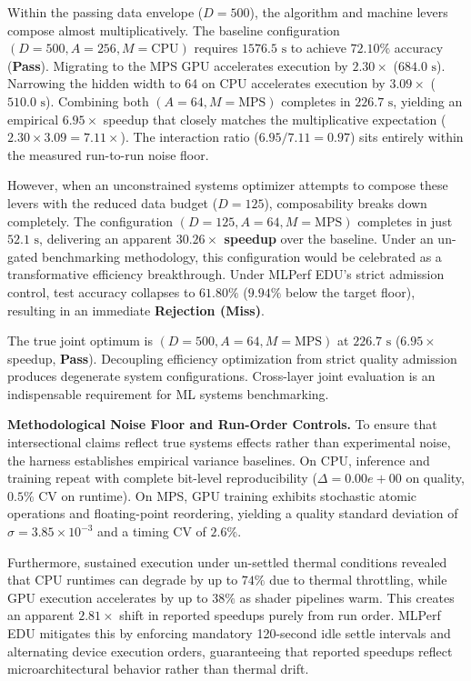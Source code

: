 \documentclass[10pt,twocolumn]{article}
\newcommand{\badgePass}{\colorbox{taggreenbg}{\fontsize{6.8}{7.8}\selectfont\color{taggreentxt}\textbf{Pass}}}
\newcommand{\badgeMiss}{\colorbox{tagredbg}{\fontsize{6.8}{7.8}\selectfont\color{tagredtxt}\textbf{Miss}}}
\begin{document}
Within the passing data envelope ($D=500$), the algorithm and machine levers compose almost multiplicatively. The baseline configuration $(D=500, A=256, M=\text{CPU})$ requires $1576.5\text{ s}$ to achieve $72.10\%$ accuracy (\badgePass). Migrating to the MPS GPU accelerates execution by $2.30\times$ ($684.0\text{ s}$). Narrowing the hidden width to 64 on CPU accelerates execution by $3.09\times$ ($510.0\text{ s}$). Combining both $(A=64, M=\text{MPS})$ completes in $226.7\text{ s}$, yielding an empirical $6.95\times$ speedup that closely matches the multiplicative expectation ($2.30\times 3.09 = 7.11\times$). The interaction ratio ($6.95 / 7.11 = 0.97$) sits entirely within the measured run-to-run noise floor.

However, when an unconstrained systems optimizer attempts to compose these levers with the reduced data budget ($D=125$), composability breaks down completely. The configuration $(D=125, A=64, M=\text{MPS})$ completes in just \textbf{$52.1\text{ s}$}, delivering an apparent \textbf{$30.26\times$ speedup} over the baseline. Under an un-gated benchmarking methodology, this configuration would be celebrated as a transformative efficiency breakthrough. Under MLPerf EDU's strict admission control, test accuracy collapses to $61.80\%$ ($9.94\%$ below the target floor), resulting in an immediate \textbf{Rejection (\badgeMiss)}.

The true joint optimum is $(D=500, A=64, M=\text{MPS})$ at $226.7\text{ s}$ ($6.95\times$ speedup, \badgePass). Decoupling efficiency optimization from strict quality admission produces degenerate system configurations. Cross-layer joint evaluation is an indispensable requirement for ML systems benchmarking.

\textbf{Methodological Noise Floor and Run-Order Controls.}
To ensure that intersectional claims reflect true systems effects rather than experimental noise, the harness establishes empirical variance baselines. On CPU, inference and training repeat with complete bit-level reproducibility ($\Delta = 0.00e+00$ on quality, $0.5\%$ CV on runtime). On MPS, GPU training exhibits stochastic atomic operations and floating-point reordering, yielding a quality standard deviation of $\sigma = 3.85\times 10^{-3}$ and a timing CV of $2.6\%$. 

Furthermore, sustained execution under un-settled thermal conditions revealed that CPU runtimes can degrade by up to $74\%$ due to thermal throttling, while GPU execution accelerates by up to $38\%$ as shader pipelines warm. This creates an apparent $2.81\times$ shift in reported speedups purely from run order. MLPerf EDU mitigates this by enforcing mandatory 120-second idle settle intervals and alternating device execution orders, guaranteeing that reported speedups reflect microarchitectural behavior rather than thermal drift.
\end{document}
